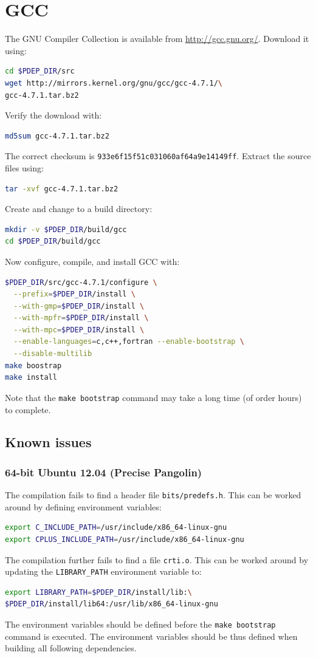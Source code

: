 \documentclass[a4paper]{article}
\begin{document}
\section{GCC}

The GNU Compiler Collection is available from \url{http://gcc.gnu.org/}.
Download it using:
\begin{lstlisting}[language = bash, frame = single]
cd $PDEP_DIR/src
wget http://mirrors.kernel.org/gnu/gcc/gcc-4.7.1/\
gcc-4.7.1.tar.bz2
\end{lstlisting}
Verify the download with:
\begin{lstlisting}[language = bash, frame = single]
md5sum gcc-4.7.1.tar.bz2
\end{lstlisting}
The correct checksum is \verb+933e6f15f51c031060af64a9e14149ff+. Extract the
source files using:
\begin{lstlisting}[language = bash, frame = single]
tar -xvf gcc-4.7.1.tar.bz2
\end{lstlisting}
Create and change to a build directory:
\begin{lstlisting}[language = bash, frame = single]
mkdir -v $PDEP_DIR/build/gcc
cd $PDEP_DIR/build/gcc
\end{lstlisting}
Now configure, compile, and install GCC with:
\begin{lstlisting}[language = bash, frame = single]
$PDEP_DIR/src/gcc-4.7.1/configure \
  --prefix=$PDEP_DIR/install \
  --with-gmp=$PDEP_DIR/install \
  --with-mpfr=$PDEP_DIR/install \
  --with-mpc=$PDEP_DIR/install \
  --enable-languages=c,c++,fortran --enable-bootstrap \
  --disable-multilib
make boostrap
make install
\end{lstlisting}
Note that the \verb+make bootstrap+ command may take a long time (of order
hours) to complete.

\subsection{Known issues}

\subsubsection*{64-bit Ubuntu 12.04 (Precise Pangolin)}

The compilation fails to find a header file \verb+bits/predefs.h+. This can be
worked around by defining environment variables:
\begin{lstlisting}[language = bash, frame = single]
export C_INCLUDE_PATH=/usr/include/x86_64-linux-gnu
export CPLUS_INCLUDE_PATH=/usr/include/x86_64-linux-gnu
\end{lstlisting}
The compilation further fails to find a file \verb+crti.o+. This can be worked
around by updating the \verb+LIBRARY_PATH+ environment variable to:
\begin{lstlisting}[language = bash, frame = single]
export LIBRARY_PATH=$PDEP_DIR/install/lib:\
$PDEP_DIR/install/lib64:/usr/lib/x86_64-linux-gnu
\end{lstlisting}
The environment variables should be defined before the \verb+make bootstrap+
command is executed. The environment variables should be thus defined when
building all following dependencies.
\end{document}
